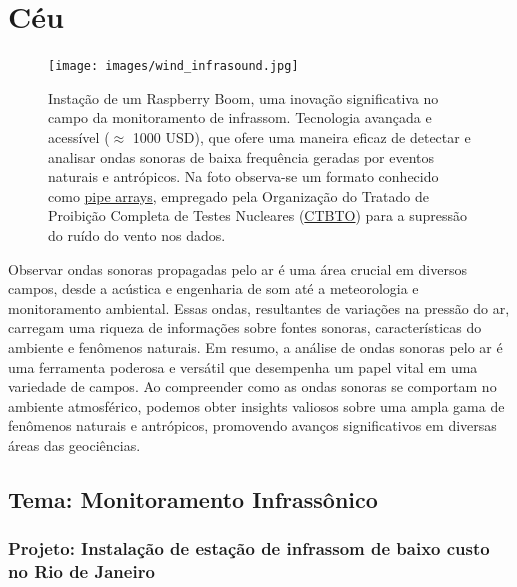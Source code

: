 \documentclass[10pt,a4paper,oneside]{book}
\newcommand{\HeroFigPad}{\vspace{-1cm}}
\begin{document}

\chapter{Céu}
\label{cap_ceu}

\begin{figure}[h]
	\HeroFigPad
	\begin{center}
		\texttt{[image: images/wind\_infrasound.jpg]}
	\end{center}
	\caption{
	Instação de um Raspberry Boom, uma inovação significativa no campo da monitoramento de infrassom. Tecnologia avançada e acessível ($\approx$ 1000 USD), que ofere uma maneira eficaz de detectar e analisar ondas sonoras de baixa frequência geradas por eventos naturais e antrópicos. Na foto observa-se um formato conhecido como \href{https://www.ctbto.org/our-work/monitoring-technologies/infrasound-monitoring}{pipe arrays}, empregado pela Organização do Tratado de Proibição Completa de Testes Nucleares (\href{https://www.ctbto.org/}{CTBTO}) para a supressão do ruído do vento nos dados.
    }
 \label{fig_wind}
\end{figure}

Observar ondas sonoras propagadas pelo ar é uma área crucial em diversos campos, desde a acústica e engenharia de som até a meteorologia e monitoramento ambiental. Essas ondas, resultantes de variações na pressão do ar, carregam uma riqueza de informações sobre fontes sonoras, características do ambiente e fenômenos naturais. Em resumo, a análise de ondas sonoras pelo ar é uma ferramenta poderosa e versátil que desempenha um papel vital em uma variedade de campos. Ao compreender como as ondas sonoras se comportam no ambiente atmosférico, podemos obter insights valiosos sobre uma ampla gama de fenômenos naturais e antrópicos, promovendo avanços significativos em diversas áreas das geociências.

\section{Tema: Monitoramento Infrassônico}

\subsection{Projeto: Instalação de estação de infrassom de baixo custo no Rio de Janeiro}
\end{document}
